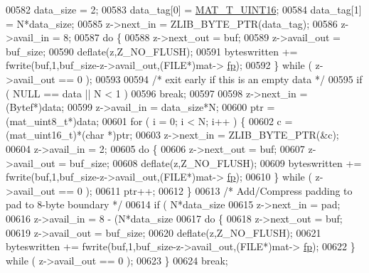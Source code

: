\begin{DoxyCode}
{{{{00582             data\_size   = 2;
00583             data\_tag[0] = \hyperlink{group___m_a_t_ggacf7b3b879282b7ab3a51190e49bf3453a05bc7af7680aa68be95126ae0a4c2e31}{MAT\_T\_UINT16};
00584             data\_tag[1] = N*data\_size;
00585             z->next\_in  = ZLIB\_BYTE\_PTR(data\_tag);
00586             z->avail\_in = 8;
00587             \textcolor{keywordflow}{do} \{
00588                 z->next\_out  = buf;
00589                 z->avail\_out = buf\_size;
00590                 deflate(z,Z\_NO\_FLUSH);
00591                 byteswritten += fwrite(buf,1,buf\_size-z->avail\_out,(FILE*)mat->
      \hyperlink{struct__mat__t_a85f562e407ca9ad4d2a6e14f839432b7}{fp});
00592             \} \textcolor{keywordflow}{while} ( z->avail\_out == 0 );
00593 
00594             \textcolor{comment}{/* exit early if this is an empty data */}
00595             \textcolor{keywordflow}{if} ( NULL == data || N < 1 )
00596                 \textcolor{keywordflow}{break};
00597 
00598             z->next\_in  = (Bytef*)data;
00599             z->avail\_in = data\_size*N;
00600             ptr = (mat\_uint8\_t*)data;
00601             \textcolor{keywordflow}{for} ( i = 0; i < N; i++ ) \{
00602                 c = (mat\_uint16\_t)*(\textcolor{keywordtype}{char} *)ptr;
00603                 z->next\_in  = ZLIB\_BYTE\_PTR(&c);
00604                 z->avail\_in = 2;
00605                 \textcolor{keywordflow}{do} \{
00606                     z->next\_out  = buf;
00607                     z->avail\_out = buf\_size;
00608                     deflate(z,Z\_NO\_FLUSH);
00609                     byteswritten += fwrite(buf,1,buf\_size-z->avail\_out,(FILE*)mat->
      \hyperlink{struct__mat__t_a85f562e407ca9ad4d2a6e14f839432b7}{fp});
00610                 \} \textcolor{keywordflow}{while} ( z->avail\_out == 0 );
00611                 ptr++;
00612             \}
00613             \textcolor{comment}{/* Add/Compress padding to pad to 8-byte boundary */}
00614             \textcolor{keywordflow}{if} ( N*data\_size %
00615                 z->next\_in  = pad;
00616                 z->avail\_in = 8 - (N*data\_size %
00617                 \textcolor{keywordflow}{do} \{
00618                     z->next\_out  = buf;
00619                     z->avail\_out = buf\_size;
00620                     deflate(z,Z\_NO\_FLUSH);
00621                     byteswritten += fwrite(buf,1,buf\_size-z->avail\_out,(FILE*)mat->
      \hyperlink{struct__mat__t_a85f562e407ca9ad4d2a6e14f839432b7}{fp});
00622                 \} \textcolor{keywordflow}{while} ( z->avail\_out == 0 );
00623             \}
00624             \textcolor{keywordflow}{break};
}}}}
\end{DoxyCode}
